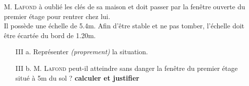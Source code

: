 \documentclass[12pt]{article}
\begin{document}
\textsc{M. Lafond} à oublié les clés de sa maison et doit passer par la fenêtre ouverte du premier étage pour rentrer chez lui. \\
Il possède une échelle de 5.4m. Afin d'être stable et ne pas tomber, l'échelle doit être écartée du bord de 1.20m. 

\begin{enumerate}
\item[III a.] Représenter \textit{(proprement)} la situation.

\item[III b.] \textsc{M. Lafond} peut-il atteindre sans danger la fenêtre du premier étage situé à 5m du sol ?  \textbf{calculer et justifier}
\end{enumerate}
\end{document}
